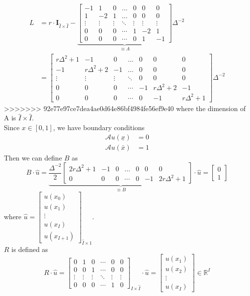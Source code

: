 \documentclass[11pt]{article}
\newcommand{\R}{\ensuremath{\mathbb{R}}}
\newcommand{\A}{\ensuremath{\mathcal{A}}}
\begin{document}
\begin{align*}
L &= r\cdot \mathbf{I}_{\hat{I}\times\hat{I}}-\underbrace{\begin{bmatrix}
-1&1&0&\dots&0&0&0\\
1&-2&1&\dots&0&0&0\\
\vdots&\vdots&\vdots&\ddots&\vdots&\vdots&\vdots\\
0&0&0&\cdots&1&-2&1\\
0&0&0&\cdots&0&1&-1
\end{bmatrix}}_{\equiv A}\Delta^{-2}
\\
& = \begin{bmatrix}
r\Delta^2+1&-1&0&\dots&0&0&0\\
-1&r\Delta^2+2&-1&\dots&0&0&0\\
\vdots&\vdots&\vdots&\ddots&0&0&0\\
0&0&0&\cdots&-1&r\Delta^2+2&-1\\
0&0&0&\cdots&0&-1&r\Delta^2+1
\end{bmatrix}\Delta^{-2}
\end{align*}
>>>>>>> 92e77e97ce7dea4ae0d64e86bf4984fe56ef9e40
where the dimension of A is $\hat{I}\times\hat{I}$.\\
Since $x\in[0, 1]$, we have boundary conditions 
\begin{align}
\A u(\underline{x}) &= 0\\
\A u(\bar{x})& = 1
\end{align}
Then we can define $B$ as
\begin{equation}
B\cdot\hat{u} =\underbrace{\frac{\Delta^{-2}}{2}\begin{bmatrix}
2r\Delta^2+1&-1&0&\dots&0&0&0\\
0&0&0&\cdots&0&-1&2r\Delta^2+1
\end{bmatrix}}_{\equiv B}\cdot\hat{u} = \begin{bmatrix}
0\\
1
\end{bmatrix}
\end{equation}
where $\hat{u} = \begin{bmatrix}
u(x_0)\\
u(x_1)\\
\vdots\\
u(x_I)\\
u(x_{I+1})
\end{bmatrix}_{\hat{I}\times 1}$.\\
$R$ is defined as 
\begin{equation}
R\cdot \hat{u} =\begin{bmatrix}
0&1&0&\cdots&0&0\\
0&0&1&\cdots&0&0\\
\vdots&\vdots&\vdots&\ddots&\vdots&\vdots\\
0&0&0&\cdots&1&0
\end{bmatrix}_{I\times\hat{I}}\cdot \hat{u}		 
=\begin{bmatrix}
u(x_1)\\
u(x_2)\\
\vdots\\
u(x_I)
\end{bmatrix} \in \R^{I} 
\end{equation}
\end{document}
